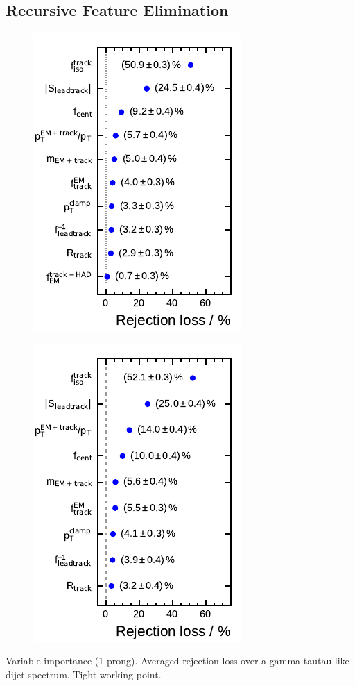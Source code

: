 \FloatBarrier
\subsection{Recursive Feature Elimination}
\noindent
\begin{minipage}{\textwidth}
  \captionsetup{type=figure}
  \centering
  \begin{subfigure}[t]{0.33\textwidth}
    \centering
    \includegraphics{./figures/bdt_perf/var_importance/1p_iter1.pdf}
  \end{subfigure}
  \begin{subfigure}[t]{0.33\textwidth}
    \centering
    \includegraphics{./figures/bdt_perf/var_importance/1p_iter2.pdf}
  \end{subfigure}
  \caption{Variable importance (1-prong). Averaged rejection loss over a
    gamma-tautau like dijet spectrum. Tight working point.}
  \label{fig:variable_importance_1p_app}
\end{minipage}

